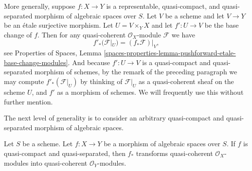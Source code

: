 \medskip\noindent
More generally, suppose $f : X \to Y$ is a representable, quasi-compact, and
quasi-separated morphism of algebraic spaces over $S$. Let $V$ be a scheme
and let $V \to Y$ be an \'etale surjective morphism. Let $U = V \times_Y X$
and let $f' : U \to V$ be the base change of $f$. Then for any
quasi-coherent $\mathcal{O}_X$-module $\mathcal{F}$ we have
\begin{equation}
\label{equation-representable-pushforward}
f'_*(\mathcal{F}|_U) = (f_*\mathcal{F})|_V,
\end{equation}
see
Properties of Spaces,
Lemma \ref{spaces-properties-lemma-pushforward-etale-base-change-modules}.
And because $f' : U \to V$ is a quasi-compact and quasi-separated
morphism of schemes, by the remark of the preceding paragraph we may
compute $f'_*(\mathcal{F}|_U)$ by thinking of $\mathcal{F}|_U$ as a
quasi-coherent sheaf on the scheme $U$, and $f'$ as a morphism of schemes.
We will frequently use this without further mention.

\medskip\noindent
The next level of generality is to consider an arbitrary
quasi-compact and quasi-separated morphism of algebraic spaces.

\begin{lemma}
\label{lemma-pushforward}
Let $S$ be a scheme.
Let $f : X \to Y$ be a morphism of algebraic spaces over $S$.
If $f$ is quasi-compact and quasi-separated, then $f_*$ transforms
quasi-coherent $\mathcal{O}_X$-modules into
quasi-coherent $\mathcal{O}_Y$-modules.
\end{lemma}

